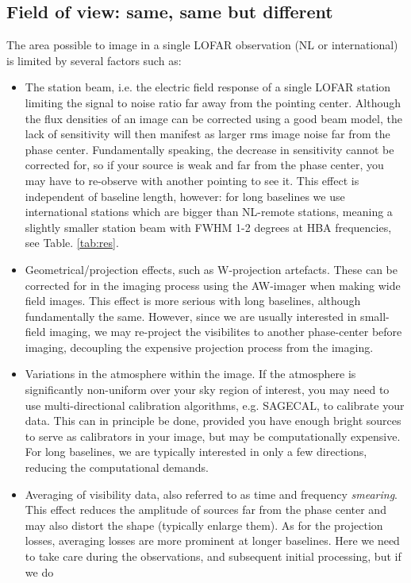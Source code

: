 \subsection{Field of view: same, same but different}
The area possible to image in a single LOFAR observation (NL or international) is limited
by several factors such as: 
\begin{itemize}
\item The station beam, i.e. the electric field response of a single LOFAR station limiting the signal to noise ratio 
far away from the pointing center. Although the flux densities of an image can be corrected using a good beam model, 
the lack of sensitivity will then manifest as larger rms image noise far from the phase center. Fundamentally speaking,
the decrease in sensitivity cannot be corrected for, so if your source is weak and far from the phase center, you may 
have to re-observe with another pointing to see it.
This effect is independent of baseline length, however: for long baselines 
we use international stations which are bigger than NL-remote stations, meaning a slightly smaller station beam with FWHM 1-2 degrees at 
HBA frequencies, see Table. \ref{tab:res}. 
\item Geometrical/projection effects, such as W-projection artefacts. These can be corrected for in the imaging process using the AW-imager
when making wide field images. This effect is more serious with long baselines, although fundamentally the same. However, since we are 
usually interested in small-field imaging, we may re-project the visibilites to another phase-center before imaging, decoupling the expensive
projection process from the imaging. 
\item Variations in the atmosphere within the image. If the atmosphere is significantly non-uniform over your sky region of interest,
you may need to use multi-directional calibration algorithms, e.g. SAGECAL, to calibrate your data. This can in principle be done, provided
you have enough bright sources to serve as calibrators in your image, but may be computationally expensive. For long baselines,
we are typically interested in only a few directions, reducing the computational demands.
\item Averaging of visibility data, also referred to as time and frequency \emph{smearing}. This effect reduces the amplitude of sources
far from the phase center and may also distort the shape (typically enlarge them). As for the projection losses, averaging losses are
more prominent at longer baselines. Here we need to take care during the observations, and subsequent initial processing, but if we do

\end{itemize}
